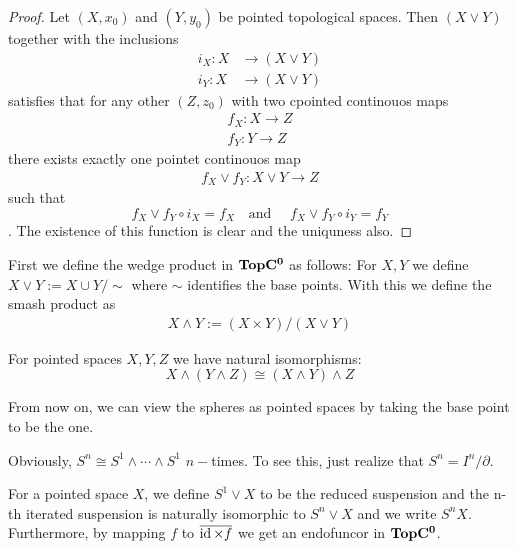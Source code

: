 \begin{proof}
	Let $(X,x_0)$ and $(Y,y_0)$ be pointed topological spaces. Then $(X\vee Y )$ together with the inclusions 
	\begin{align*}
		i_X: X &\to (X\vee Y)\\
		i_Y: X &\to (X\vee Y)
	\end{align*}
	 satisfies that for any other $(Z,z_0)$ with two cpointed continouos maps 
	 \begin{align*}
	 	f_X: X\to Z\\
	 	f_Y: Y\to Z
	 \end{align*} there exists exactly one pointet continouos map 
	 \begin{align*}
	 	f_X\vee f_Y: X\vee Y\to Z 
	 \end{align*} such that 
	 \begin{equation*}
	 	f_X\vee f_Y \circ i_X= f_X \quad \text{and }\quad f_X\vee f_Y \circ i_Y=f_Y
	 \end{equation*}. The existence of this function is clear and the uniquness also.
\end{proof}
\begin{definition}
	First we define the wedge product in $\operatorname{\mathbf{TopC^0}}$ as follows:
	For $X,Y$ we define $X \vee  Y:= X \cup Y \slash \sim$ where $\sim$ identifies the base points. With this we define the smash product as
	\begin{align*}
		X \wedge  Y := (X\times Y)\slash (X \vee Y )
	\end{align*}
\end{definition}
\begin{prop}
	For pointed spaces $X,Y,Z$ we have natural isomorphisms:
	\begin{equation*}
		X\wedge(Y\wedge Z) \cong (X\wedge Y)\wedge Z
	\end{equation*}
\end{prop}
From now on, we can view the spheres as pointed spaces by taking the base point to be the one. 
\begin{cor}
	Obviously, $S^n\cong S^1\wedge \cdots \wedge S^1 $ $n-$times. To see this, just realize that $S^n=I^n\slash \partial$. 
\end{cor}
\begin{definition}
	For a pointed space $X$, we define $S^1\vee X$ to be the reduced suspension and the n-th iterated suspension is naturally isomorphic to $S^n\vee X$ and we write $S^nX$. Furthermore, by mapping $f$ to $\overline{\operatorname{\text{id}} \times f}$ we get an endofuncor in $\operatorname{\mathbf{TopC^0}}$.
\end{definition}

